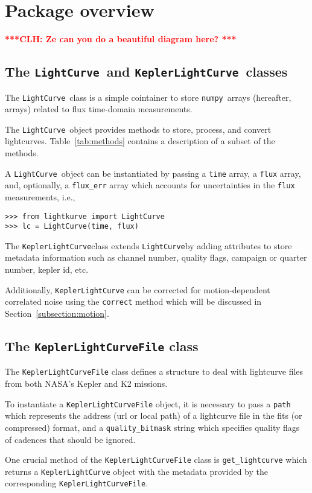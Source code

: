 \documentclass[twocolumn]{aastex62}
\newcommand{\LightCurve}{\texttt{LightCurve}}
\newcommand{\KeplerLightCurve}{\texttt{KeplerLightCurve}}
\newcommand{\numpy}{\texttt{numpy}}
\newcommand{\clh}[1]{\textcolor{red}{ \textbf{***CLH: #1 ***}}}
\begin{document}
\section{Package overview}


\clh{Ze can you do a beautiful diagram here?}

\subsection{The \LightCurve~and \KeplerLightCurve~classes}
The \LightCurve~class is a simple cointainer to store \numpy~arrays
(hereafter, arrays) related to flux time-domain measurements.

The \LightCurve~object provides methods to store, process, and
convert lightcurves. Table~\ref{tab:methods} contains a description
of a subset of the methods.

A \LightCurve~object can be instantiated by passing a \texttt{time}
array, a \texttt{flux} array, and, optionally, a \texttt{flux\_err} array
which accounts for uncertainties in the \texttt{flux} measurements, i.e.,
\begin{verbatim}
>>> from lightkurve import LightCurve
>>> lc = LightCurve(time, flux)
\end{verbatim}

The \KeplerLightCurve class extends \LightCurve by
adding attributes to store metadata information such as channel number,
quality flags, campaign or quarter number, kepler id, etc.

Additionally, \texttt{KeplerLightCurve} can be corrected for motion-dependent
correlated noise using the \texttt{correct} method which will be discussed in
Section~\ref{subsection:motion}.

\subsection{The \texttt{KeplerLightCurveFile} class}
The \texttt{KeplerLightCurveFile} class defines a structure to deal
with lightcurve files from both NASA's Kepler and K2 missions.

To instantiate a \texttt{KeplerLightCurveFile} object, it is necessary
to pass a \texttt{path} which represents the address (url or local path)
of a lightcurve file in the fits (or compressed) format, and a
\texttt{quality\_bitmask} string which specifies quality
flags of cadences that should be ignored.

One crucial method of the \texttt{KeplerLightCurveFile} class is
\texttt{get\_lightcurve} which returns a \texttt{KeplerLightCurve} object
with the metadata provided by the corresponding \texttt{KeplerLightCurveFile}.
\end{document}
